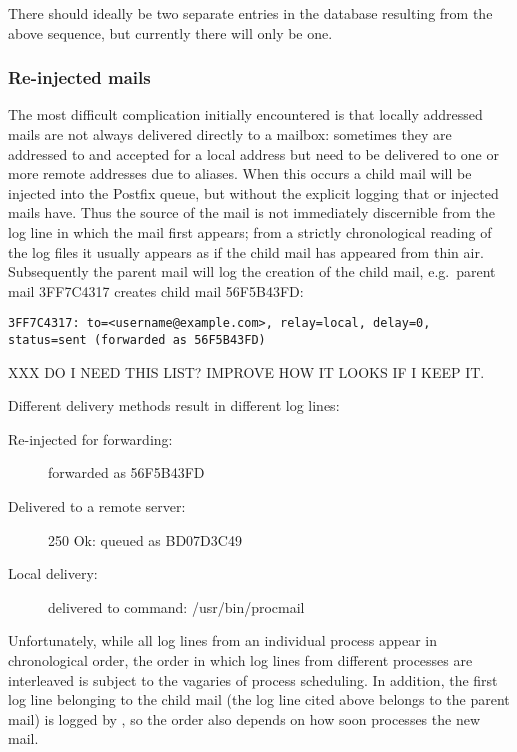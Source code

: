 There should ideally be two separate entries in the database resulting from
the above sequence, but currently there will only be one.



\subsubsection{Re-injected mails}

\label{Re-injected mails}

The most difficult complication initially encountered is that locally
addressed mails are not always delivered directly to a mailbox: sometimes
they are addressed to and accepted for a local address but need to be
delivered to one or more remote addresses due to aliases.  When this
occurs a child mail will be injected into the Postfix queue, but without
the explicit logging that  or  injected
mails have.  Thus the source of the mail is not immediately discernible
from the log line in which the mail first appears; from a strictly
chronological reading of the log files it usually appears as if the child
mail has appeared from thin air.  Subsequently the parent mail will log the
creation of the child mail, e.g.\ parent mail 3FF7C4317 creates child mail
56F5B43FD\@:

\texttt{3FF7C4317: to=<username@example.com>, relay=local, \newline{}
\tab{} delay=0, status=sent (forwarded as 56F5B43FD)}

XXX DO I NEED THIS LIST\@? IMPROVE HOW IT LOOKS IF I KEEP IT\@.

Different delivery methods result in different log lines:

\begin{description}

    \item [Re-injected for forwarding:] forwarded as 56F5B43FD

    \item [Delivered to a remote \SMTP{} server:] 250 Ok: queued as
        BD07D3C49

    \item [Local delivery:] delivered to command: /usr/bin/procmail

\end{description}

Unfortunately, while all log lines from an individual process appear in
chronological order, the order in which log lines from different processes
are interleaved is subject to the vagaries of process scheduling.  In
addition, the first log line belonging to the child mail (the log line
cited above belongs to the parent mail) is logged by , so the
order also depends on how soon  processes the new mail.

